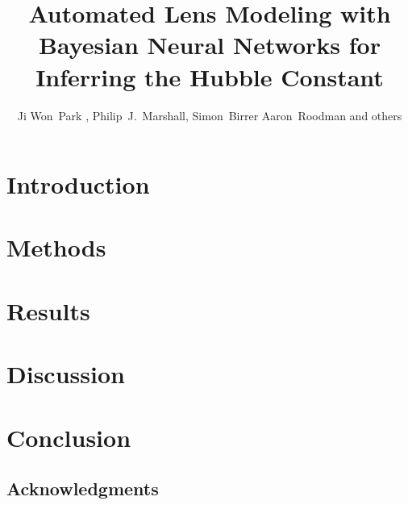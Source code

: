 \documentclass[apj]{emulateapj}
\begin{document}
\title{Automated Lens Modeling with Bayesian Neural Networks for Inferring the Hubble Constant}

\author{{Ji Won~Park} , {Philip~J.~Marshall},
{Simon~Birrer}
{Aaron~Roodman} and others}

\maketitlepre

\begin{abstract}

  

\end{abstract}



\maketitlepost

\section{Introduction}
\label{sec:intro}


\section{Methods}
\label{sec:methods}


\section{Results}
\label{sec:results}


\section{Discussion}
\label{sec:discussion}


\section{Conclusion}
\label{sec:conclusion}


\subsection*{Acknowledgments}
\end{document}
